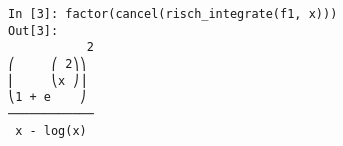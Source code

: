 ﻿\documentclass{article}
\begin{document}
\normalsize
\begin{Verbatim}
In [3]: factor(cancel(risch_integrate(f1, x)))
Out[3]: 
           2
⎛     ⎛ 2⎞⎞ 
⎜     ⎝x ⎠⎟ 
⎝1 + e    ⎠ 
────────────
 x - log(x) 
\end{Verbatim}
\end{document}

